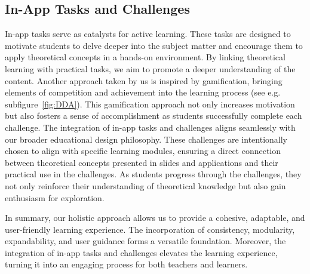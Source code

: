 \subsection{In-App Tasks and Challenges}
In-app tasks serve as catalysts for active learning. These tasks are designed to motivate students to delve deeper into the subject matter and encourage them to apply theoretical concepts in a hands-on environment. By linking theoretical learning with practical tasks, we aim to promote a deeper understanding of the content. Another approach taken by us is inspired by gamification, bringing elements of competition and achievement into the learning process (see e.g. subfigure~\ref{fig:DDA}).
This gamification approach not only increases motivation but also fosters a sense of accomplishment as students successfully complete each challenge. The integration of in-app tasks and challenges aligns seamlessly with our broader educational design philosophy. These challenges are intentionally chosen to align with specific learning modules, ensuring a direct connection between theoretical concepts presented in slides and applications and their practical use in the challenges. As students progress through the challenges, they not only reinforce their understanding of theoretical knowledge but also gain enthusiasm for exploration.

In summary, our holistic approach allows us to provide a cohesive, adaptable, and user-friendly learning experience. The incorporation of consistency, modularity, expandability, and user guidance forms a versatile foundation. Moreover, the integration of in-app tasks and challenges elevates the learning experience, turning it into an engaging process for both teachers and learners.

